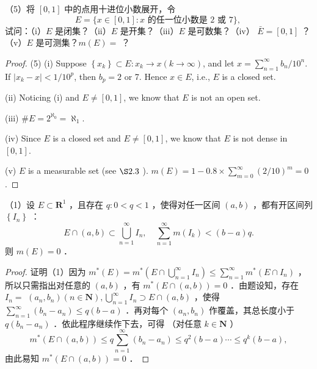 \begin{exercise}
（5）将 $[0,1]$ 中的点用十进位小数展开，令
\[
E=\{x \in[0,1]: x \text { 的任一位小数是 } 2 \text { 或 } 7\} \text {, }
\]试问：（i）$E$ 是闭集？（ii）$E$ 是开集？（iii）$E$ 是可数集？（iv） $\bar{E}=[0,1]$ ？ （v）$E$ 是可测集？$m(E)=$ ？
\end{exercise}
\begin{proof}
(5) (i) Suppose $\left\{x_k\right\} \subset E: x_k \rightarrow x(k \rightarrow \infty)$, and let $x=\sum_{n=1}^{\infty} b_n / 10^n$. If $\left|x_k-x\right|<1 / 10^p$, then $b_p=2$ or 7. Hence $x \in E$, i.e., $E$ is a closed set.

(ii) Noticing (i) and $E \neq[0,1]$, we know that $E$ is not an open set.

(iii) $\#E =2^{\aleph_0}=\aleph_1$.

(iv) Since $E$ is a closed set and $E \neq[0,1]$, we know that $E$ is not dense in $[0,1]$.

(v) $E$ is a measurable set (see $\S 2.3$ ). $m(E)=1-0.8 \times \sum_{m=0}^{\infty}(2 / 10)^m=0$.

\end{proof}

\begin{exercise}
（1）设 $E \subset \mathbf{R}^1$ ，且存在 $q: 0<q<1$ ，使得对任一区间 $(a, b)$ ，都有开区间列 $\left\{I_n\right\}$ ：
\[
E \cap(a, b) \subset \bigcup_{n=1}^{\infty} I_n, \quad \sum_{n=1}^{\infty} m\left(I_k\right)<(b-a) q .
\]则 $m(E)=0$ ．
\end{exercise}
\begin{proof}
证明（1）因为 $m^*(E)=m^*\left(E \cap \bigcup_{n=1}^{\infty} I_n\right) \leqslant \sum_{n=1}^{\infty} m^*\left(E \cap I_n\right)$ ，所以只需指出对任意的 $(a, b)$ ，有 $m^*(E \cap(a, b))=0$ ．由题设知，存在 $I_n=$ $\left(a_n, b_n\right)(n \in \mathbf{N}), \bigcup_{n=1}^{\infty} I_n \supset E \cap(a, b)$ ，使得 $\sum_{n=1}^{\infty}\left(b_n-a_n\right) \leqslant q(b-a)$ ．再对每个 $\left(a_n, b_n\right)$ 作覆盖，其总长度小于 $q\left(b_n-a_n\right)$ ．依此程序继续作下去，可得 （对任意 $k \in \mathbf{N}$ ）
\[
m^*(E \cap(a, b)) \leqslant q \sum_{n=1}^{\infty}\left(b_n-a_n\right) \leqslant q^2(b-a) \cdots \leqslant q^k(b-a),
\]
由此易知 $m^*(E \cap(a, b))=0$ ．

\end{proof}

